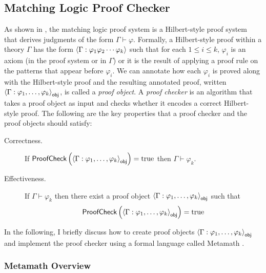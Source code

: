\documentclass[11pt]{article}
\begin{document}
\subsection{Matching Logic Proof Checker}
\label{sec:proposed-mlpc}

As shown in , the matching logic proof system is a Hilbert-style 
proof system that derives judgments of the form
$\Gamma \vdash \varphi$. 
Formally, a Hilbert-style proof within a theory $\Gamma$ has the form
$\left\langle\Gamma : \varphi_1 \varphi_2 \cdots \varphi_k\right\rangle$ such that
for each $1 \le i \le k$, 
$\varphi_i$ is an axiom (in the proof system or in $\Gamma$)
or it is the result of applying a proof rule on the patterns that appear before 
$\varphi_i$. 
We can annotate how each $\varphi_i$ is proved along with the Hilbert-style 
proof and the resulting annotated proof,
written $\left\langle\Gamma : \varphi_1,\dots,\varphi_k\right\rangle_{\mathsf{obj}}$, is called a \emph{proof 
object}.
A \emph{proof checker} is an algorithm that takes a proof object as input and 
checks whether it encodes a correct Hilbert-style proof. 
The following are the key properties that a proof checker and the proof objects 
should satisfy:
\begin{description}
\item[Correctness.]
If $\mathsf{ProofCheck}\left( \left\langle\Gamma : \varphi_1,\dots,\varphi_k\right\rangle_{\mathsf{obj}} \right) = 
\text{true}$ then $\Gamma \vdash \varphi_k$.
\item[Effectiveness.]
If $\Gamma \vdash \varphi_k$ then
there exist a proof object $\left\langle\Gamma : \varphi_1,\dots,\varphi_k\right\rangle_{\mathsf{obj}}$
such that $$\mathsf{ProofCheck}\left( \left\langle\Gamma : \varphi_1,\dots,\varphi_k\right\rangle_{\mathsf{obj}} \right) = 
\text{true}$$
\end{description}

In the following, I briefly discuss how to create proof objects
$\left\langle\Gamma : \varphi_1,\dots,\varphi_k\right\rangle_{\mathsf{obj}}$ and implement
the proof checker using a formal language called Metamath \cite{metamath}. 

\subsubsection{Metamath Overview}
\label{sec:metamath}
 
\end{document}
